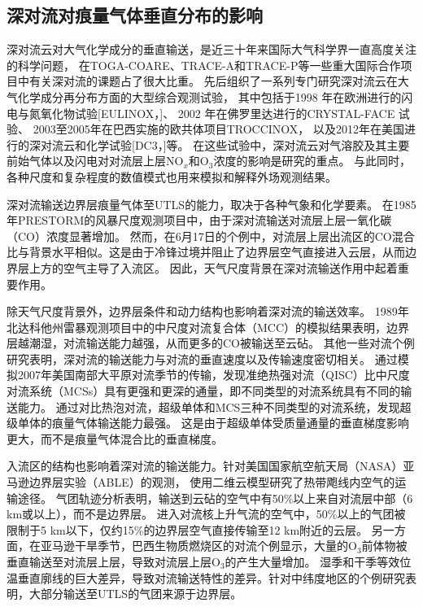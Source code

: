 \subsection{深对流对痕量气体垂直分布的影响}

深对流云对大气化学成分的垂直输送，是近三十年来国际大气科学界一直高度关注的科学问题，
在TOGA-COARE\citep{Webster.1992}、TRACE-A\citep{Fishman.1996}和TRACE-P\citep{Jacob.2003}等一些重大国际合作项目中有关深对流的课题占了很大比重。
先后组织了一系列专门研究深对流云在大气化学成分再分布方面的大型综合观测试验，
其中包括于1998 年在欧洲进行的闪电与氮氧化物试验[EULINOX，\citet{Holler.2000}]、
2002 年在佛罗里达进行的CRYSTAL-FACE 试验\citep{Toon.2003}、
2003至2005年在巴西实施的欧共体项目TROCCINOX\citep{Huntrieser.2008}，
以及2012年在美国进行的深对流云和化学试验[DC3，\citet{Barth.2019}]等。
在这些试验中，深对流云对气溶胶及其主要前始气体以及闪电对对流层上层NO$_x$和O$_3$浓度的影响是研究的重点。
与此同时，各种尺度和复杂程度的数值模式也用来模拟和解释外场观测结果。

深对流输送边界层痕量气体至UTLS的能力，取决于各种气象和化学要素。
在1985年PRESTORM的风暴尺度观测项目中，由于深对流输送对流层上层一氧化碳（CO）浓度显著增加\citep{Dickerson.1987,Pickering.1989}。
然而，在6月17日的个例中，对流层上层出流区的CO混合比与背景水平相似。这是由于冷锋过境并阻止了边界层空气直接进入云层，从而边界层上方的空气主导了入流区\citep{Pickering.1988}。
因此，天气尺度背景在深对流输送作用中起着重要作用。

除天气尺度背景外，边界层条件和动力结构也影响着深对流的输送效率。
1989年北达科他州雷暴观测项目中的中尺度对流复合体（MCC）的模拟结果表明，边界层越潮湿，对流输送能力越强，从而更多的CO被输送至云砧\citep{Stenchikov.1996}。
其他一些对流个例研究表明，深对流的输送能力与对流的垂直速度以及传输速度密切相关\citep{Pickering.1992a,Wang.1996}。
\citet{Bigelbach.2014}通过模拟2007年美国南部大平原对流季节的传输，发现准绝热强对流（QISC）比中尺度对流系统（MCSs）具有更强和更深的通量，即不同类型的对流系统具有不同的输送能力。
\citet{Li.2017b}通过对比热泡对流，超级单体和MCS三种不同类型的对流系统，发现超级单体的痕量气体输送能力最强。
这是由于超级单体受质量通量的垂直梯度影响更大，而不是痕量气体混合比的垂直梯度。

入流区的结构也影响着深对流的输送能力。针对美国国家航空航天局（NASA）亚马逊边界层实验（ABLE）的观测，
\citet{Scala.1990}使用二维云模型研究了热带飑线内空气的运输途径。
气团轨迹分析表明，输送到云砧的空气中有50\%以上来自对流层中部（6 km或以上），而不是边界层。
进入对流核上升气流的空气中，50\%以上的气团被限制于5 km以下，仅约15\%的边界层空气直接传输至12 km附近的云层。
另一方面，在亚马逊干旱季节，巴西生物质燃烧区的对流个例显示，大量的O$_3$前体物被垂直输送至对流层上层，导致对流层上层O$_3$的产生大量增加\citep{Pickering.1992,Pickering.1992a,Pickering.1996}。
湿季和干季等效位温垂直廓线的巨大差异，导致对流输送特性的差异。针对中纬度地区的个例研究表明，大部分输送至UTLS的气团来源于边界层\citep{Mullendore.2005,Skamarock.2000}。

